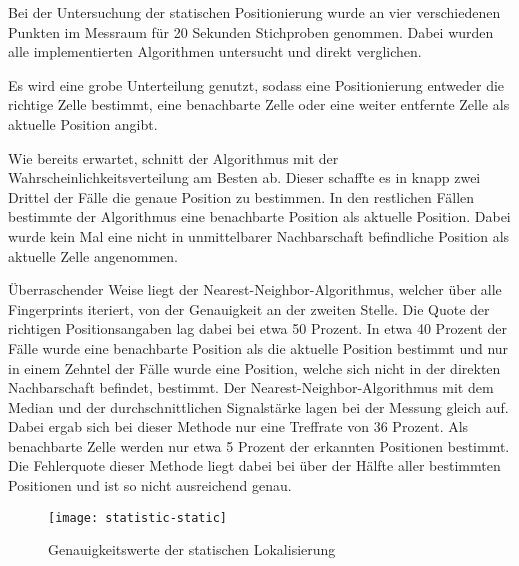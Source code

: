 Bei der Untersuchung der statischen Positionierung wurde an vier verschiedenen Punkten im Messraum für 20 Sekunden Stichproben genommen. Dabei wurden alle implementierten Algorithmen untersucht und direkt verglichen.

Es wird eine grobe Unterteilung genutzt, sodass eine Positionierung entweder die richtige Zelle bestimmt, eine benachbarte Zelle oder eine weiter entfernte Zelle als aktuelle Position angibt. 

Wie bereits erwartet, schnitt der Algorithmus mit der Wahrscheinlichkeitsverteilung am Besten ab. Dieser schaffte es in knapp zwei Drittel der Fälle die genaue Position zu bestimmen. In den restlichen Fällen bestimmte der Algorithmus eine benachbarte Position als aktuelle Position. Dabei wurde kein Mal eine nicht in unmittelbarer Nachbarschaft befindliche Position als aktuelle Zelle angenommen. 

Überraschender Weise liegt der Nearest-Neighbor-Algorithmus, welcher über alle Fingerprints iteriert, von der Genauigkeit an der zweiten Stelle. Die Quote der richtigen Positionsangaben lag dabei bei etwa 50 Prozent. In etwa 40 Prozent der Fälle wurde eine benachbarte Position als die aktuelle Position bestimmt und nur in einem Zehntel der Fälle wurde eine Position, welche sich nicht in der direkten Nachbarschaft befindet, bestimmt.
Der Nearest-Neighbor-Algorithmus mit dem Median und der durchschnittlichen Signalstärke lagen bei der Messung gleich auf. Dabei ergab sich bei dieser Methode nur eine Treffrate von 36 Prozent. Als benachbarte Zelle werden nur etwa 5 Prozent der erkannten Positionen bestimmt. Die Fehlerquote dieser Methode liegt dabei bei über der Hälfte aller bestimmten Positionen und ist so nicht ausreichend genau.

\begin{figure}[htb!]
		\centering
	\texttt{[image: statistic-static]}
	\caption{Genauigkeitswerte der statischen Lokalisierung}
	\label{statistic-static}
	\end{figure}
 
